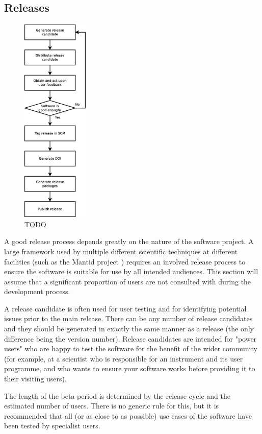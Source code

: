 \documentclass[jnr]{iosart2x}
\begin{document}
\subsection{Releases}
\label{Releases}

\begin{figure}
    \centering
    \includegraphics[height=10cm]{release_workflow.eps}
    \caption{TODO}
    \label{Release_Flowchart}
\end{figure}

A good release process depends greatly on the nature of the software project.
A large framework used by multiple different scientific techniques at different facilities (such as the Mantid project \cite{Manitd}) requires an involved release process to ensure the software is suitable for use by all intended audiences.
This section will assume that a significant proportion of users are not consulted with during the development process.

A release candidate is often used for user testing and for identifying potential issues prior to the main release. 
There can be any number of release candidates and they should be generated in exactly the same manner as a release (the only difference being the version number).
Release candidates are intended for "power users" who are happy to test the software for the benefit of the wider community (for example, at a scientist who is responsible for an instrument and its user programme, and who wants to ensure your software works before providing it to their visiting users).

The length of the beta period is determined by the release cycle and the estimated number of users.
There is no generic rule for this, but it is recommended that all (or as close to as possible) use cases of the software have been tested by specialist users.
\end{document}
